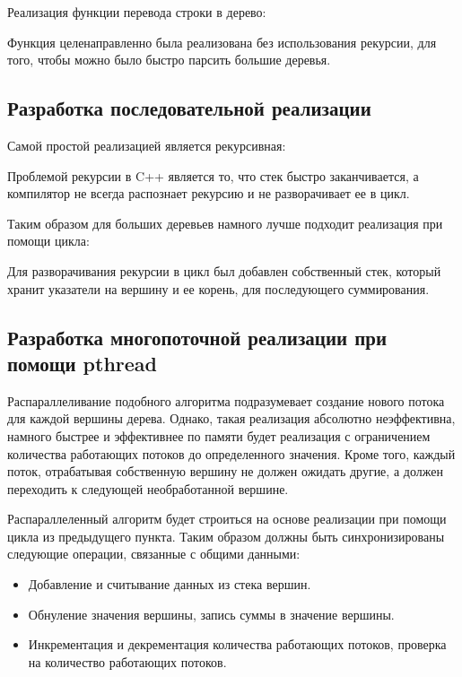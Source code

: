 \documentclass[14pt,a4paper,report]{report}
\begin{document}
Реализация функции перевода строки в дерево:



Функция целенаправленно была реализована без использования рекурсии, для того, чтобы можно было быстро парсить большие деревья.

\subsection{Разработка последовательной реализации}

Самой простой реализацией является рекурсивная:



Проблемой рекурсии в C++ является то, что стек быстро заканчивается, а компилятор не всегда распознает рекурсию и не разворачивает ее в цикл.

Таким образом для больших деревьев намного лучше подходит реализация при помощи цикла:



Для разворачивания рекурсии в цикл был добавлен собственный стек, который хранит указатели на вершину и ее корень, для последующего суммирования.

\subsection{Разработка многопоточной реализации при помощи pthread}

Распараллеливание подобного алгоритма подразумевает создание нового потока для каждой вершины дерева. Однако, такая реализация абсолютно неэффективна, намного быстрее и эффективнее по памяти будет реализация с ограничением количества работающих потоков до определенного значения. Кроме того, каждый поток, отрабатывая собственную вершину не должен ожидать другие, а должен переходить к следующей необработанной вершине.

Распараллеленный алгоритм будет строиться на основе реализации при помощи цикла из предыдущего пункта. Таким образом должны быть синхронизированы следующие операции, связанные с общими данными:

\begin{itemize}
	\item Добавление и считывание данных из стека вершин.
	\item Обнуление значения вершины, запись суммы в значение вершины.
	\item Инкрементация и декрементация количества работающих потоков, проверка на количество работающих потоков.
\end{itemize}
\end{document}
